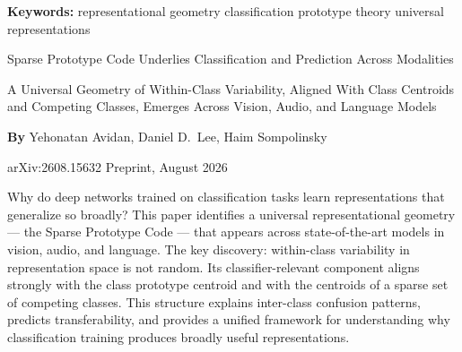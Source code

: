 \documentclass[10pt,twocolumn]{article}
\begin{document}
\setlength{\parindent}{0pt}
\setlength{\parskip}{4pt}

{\small\color{keywordgray}\textbf{Keywords:}
  representational geometry \textbullet{}
  classification \textbullet{}
  prototype theory \textbullet{}
  universal representations}\par\vspace{4pt}

{\LARGE\bfseries\raggedright
  Sparse Prototype Code Underlies Classification
  and Prediction Across Modalities}\par\vspace{4pt}

{\large\itshape\raggedright
  A Universal Geometry of Within-Class Variability, Aligned With Class
  Centroids and Competing Classes, Emerges Across Vision, Audio,
  and Language Models}\par\vspace{6pt}

{\small\textbf{By} Yehonatan Avidan, Daniel D.\ Lee, Haim Sompolinsky}\par\vspace{2pt}

{\small\color{keywordgray}arXiv:2608.15632 \textbullet{} Preprint, August 2026}
\par\vspace{2pt}\noindent{\color{rulered}\rule{\columnwidth}{0.6pt}}\vspace{6pt}

Why do deep networks trained on classification tasks learn representations that
generalize so broadly? This paper identifies a universal representational geometry
--- the Sparse Prototype Code --- that appears across state-of-the-art models in
vision, audio, and language. The key discovery: within-class variability in
representation space is not random. Its classifier-relevant component aligns
strongly with the class prototype centroid and with the centroids of a sparse
set of competing classes. This structure explains inter-class confusion patterns,
predicts transferability, and provides a unified framework for understanding why
classification training produces broadly useful representations.
\end{document}
